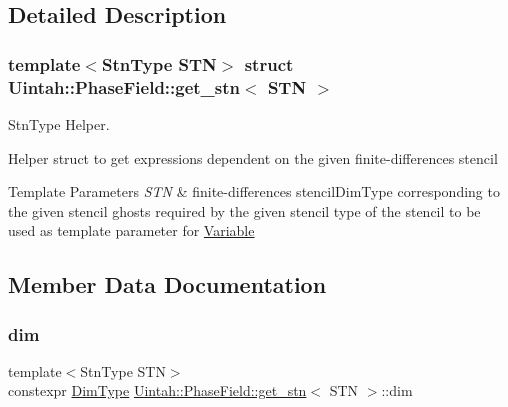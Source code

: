 \subsection{Detailed Description}
\subsubsection*{template$<$Stn\+Type S\+TN$>$\newline
struct Uintah\+::\+Phase\+Field\+::get\+\_\+stn$<$ S\+T\+N $>$}

Stn\+Type Helper. 

Helper struct to get expressions dependent on the given finite-\/differences stencil 
\begin{DoxyTemplParams}{Template Parameters}
{\em S\+TN} & finite-\/differences stencil\+Dim\+Type corresponding to the given stencil ghosts required by the given stencil type of the stencil to be used as template parameter for \hyperlink{structUintah_1_1PhaseField_1_1Variable}{Variable} \\
\hline
\end{DoxyTemplParams}


\subsection{Member Data Documentation}
\mbox{\label{structUintah_1_1PhaseField_1_1get__stn_a750e0efa7ab05525da0069da316ebae7}} 
\subsubsection{\texorpdfstring{dim}{dim}}
{\footnotesize\ttfamily template$<$Stn\+Type S\+TN$>$ \\
constexpr \hyperlink{namespaceUintah_1_1PhaseField_a12bfc68444894dffdf0cb8d9cf0cc76a}{Dim\+Type} \hyperlink{structUintah_1_1PhaseField_1_1get__stn}{Uintah\+::\+Phase\+Field\+::get\+\_\+stn}$<$ S\+TN $>$\+::dim\hspace{0.3cm}{\ttfamily [static]}}

\mbox{\label{structUintah_1_1PhaseField_1_1get__stn_ab0af4afe766520c639bdc3528e577018}} 
